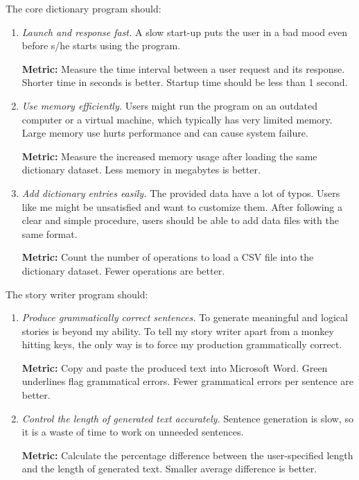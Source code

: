\documentclass[../main.tex]{subfiles}
\begin{document}
The core dictionary program should:

\begin{enumerate}
	\item \textit{Launch and response fast.}
	A slow start-up puts the user in a bad mood even before s/he starts using the program.
	
	\textbf{Metric:} Measure the time interval between a user request and its response. Shorter time in seconds is better. Startup time should be less than 1 second.
	
	\item \textit{Use memory efficiently.}
	Users might run the program on an outdated computer or a virtual machine, which typically has very limited memory. Large memory use hurts performance and can cause system failure.
	
	\textbf{Metric:} Measure the increased memory usage after loading the same dictionary dataset. Less memory in megabytes is better.
	
	\item \textit{Add dictionary entries easily.}
	The provided data have a lot of typos. Users like me might be unsatisfied and want to customize them. After following a clear and simple procedure, users should be able to add data files with the same format.
	
	\textbf{Metric:} Count the number of operations to load a CSV file into the dictionary dataset. Fewer operations are better.
\end{enumerate}

The story writer program should:

\begin{enumerate}
	\item \textit{Produce grammatically correct sentences.}
	To generate meaningful and logical stories is beyond my ability. To tell my story writer apart from a monkey hitting keys, the only way is to force my production grammatically correct.
	
	\textbf{Metric:} Copy and paste the produced text into Microsoft Word. Green underlines flag grammatical errors. Fewer grammatical errors per sentence are better.
	
	\item \textit{Control the length of generated text accurately.}
	Sentence generation is slow, so it is a waste of time to work on unneeded sentences.
	
	\textbf{Metric:} Calculate the percentage difference between the user-specified length and the length of generated text. Smaller average difference is better.
\end{enumerate}
\end{document}
